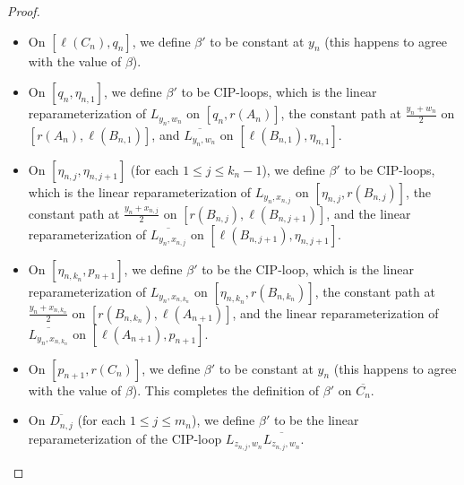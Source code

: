 \documentclass[12pt, leqno]{amsart}
\newcommand{\ov}{\overline}
\theoremstyle{definition}\newtheorem{definition}[theorem]{Definition}
\begin{document}
\begin{proof}
\begin{itemize}
    \item[$\bf (B1)$]\label{beta'1} On $[\ell(C_n), q_n]$, we define $\beta'$ to be constant at $y_n$ (this happens to agree with the value of $\beta$).
\vspace{.75em}
    \item[$\bf (B2)$]\label{beta'2} On $[ q_n,\eta_{n,1}]$, we define $\beta'$ to be CIP-loops, which is the linear reparameterization of $L_{y_n,w_n}$ on $[ q_n,r(A_n)]$, the constant path at $\frac{y_n+w_n}{2}$ on $[r(A_n),\ell(B_{n,1})]$, and $\ov{L_{y_n,w_n}}$ on $[\ell(B_{n,1}),\eta_{n,1}]$.
\vspace{.75em}
    \item[$\bf (B3)$]\label{beta'3} On $[\eta_{n,j},\eta_{n,j+1}]$ (for each $ 1\leq j\leq k_n-1$), we define $\beta'$ to be CIP-loops, which is the linear reparameterization of $L_{y_n,x_{n,j}}$ on $[\eta_{n,j},r(B_{n,j})]$, the constant path at $\frac{y_n+x_{n,j}}{2}$ on $[r(B_{n,j}),\ell(B_{n,j+1})]$, and the linear reparameterization of $\ov{L_{y_n,x_{n,j}}}$ on $[\ell(B_{n,j+1}),\eta_{n,j+1}]$.
\vspace{.75em}
    \item[$\bf (B4)$]\label{beta'4} On $[\eta_{n,k_n},p_{n+1}]$, we define $\beta'$ to be the CIP-loop, which is the linear reparameterization of $L_{y_n,x_{n,k_n}}$ on $[\eta_{n,k_n},r(B_{n,k_n})]$, the constant path at $\frac{y_n+x_{n,k_n}}{2}$ on $[r(B_{n,k_n}),\ell(A_{n+1})]$, and the linear reparameterization of $\ov{L_{y_n,x_{n,k_n}}}$ on $[\ell(A_{n+1}),p_{n+1}]$.
\vspace{.75em}
    \item[$\bf (B5)$]\label{beta'5} On $[p_{n+1},r(C_n)]$, we define $\beta'$ to be constant at $y_n$ (this happens to agree with the value of $\beta$). This completes the definition of $\beta '$ on $\ov{C_n}$.
\vspace{.75em}
    \item[$\bf (B6)$]\label{beta'6} On $\ov{D_{n,j}}$ (for each $1\leq j\leq m_n$), we define $\beta'$ to be the linear reparameterization of the CIP-loop $L_{z_{n,j},w_{n}} \ov{L_{z_{n,j},w_{n}}}$.
\end{itemize}


\end{proof}
\end{document}
